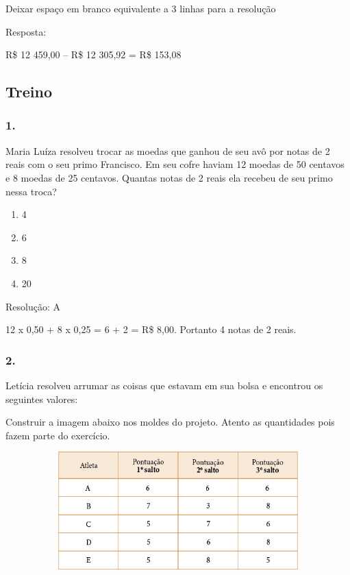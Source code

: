 Deixar espaço em branco equivalente a 3 linhas para a resolução

Resposta:

R\$ 12 459,00 -- R\$ 12 305,92 = R\$ 153,08

\subsection{Treino}\label{treino-5}

\subsubsection{1.}\label{section-75}

Maria Luíza resolveu trocar as moedas que ganhou de seu avô por notas de
2 reais com o seu primo Francisco. Em seu cofre haviam 12 moedas de 50
centavos e 8 moedas de 25 centavos. Quantas notas de 2 reais ela recebeu
de seu primo nessa troca?

\begin{enumerate}
\def\labelenumi{\alph{enumi})}
\item
  4
\item
  6
\item
  8
\item
  20
\end{enumerate}

Resolução: A

12 x 0,50 + 8 x 0,25 = 6 + 2 = R\$ 8,00. Portanto 4 notas de 2 reais.

\subsubsection{2.}\label{section-76}

Letícia resolveu arrumar as coisas que estavam em sua bolsa e encontrou
os seguintes valores:

Construir a imagem abaixo nos moldes do projeto. \textbar{}Atento as
quantidades pois fazem parte do exercício.

\includegraphics[width=5.90556in,height=1.78681in]{media/image88.png}

